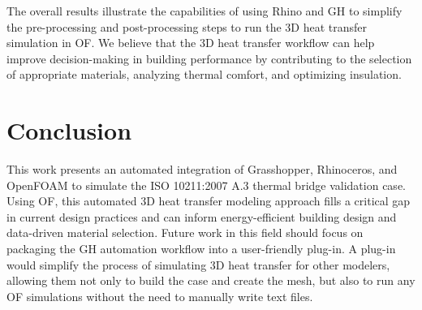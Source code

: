 \documentclass[runningheads]{llncs}
\begin{document}
The overall results illustrate the capabilities of using Rhino and GH to simplify the pre-processing and post-processing steps to run the 3D heat transfer simulation in OF. 
We believe that the 3D heat transfer workflow can help improve decision-making in building performance by contributing to the selection of appropriate materials, analyzing thermal comfort, and optimizing insulation. %


\enlargethispage{2\baselineskip}


\section{Conclusion}
This work presents an automated integration of Grasshopper, Rhinoceros, and OpenFOAM to simulate the ISO 10211:2007 A.3 thermal bridge validation case. Using OF, this automated 3D heat transfer modeling approach fills a critical gap in current design practices and can inform energy-efficient building design and data-driven material selection. Future work in this field should focus on packaging the GH automation workflow into a user-friendly plug-in. A plug-in would simplify the process of simulating 3D heat transfer for other modelers, allowing them not only to build the case and create the mesh, but also to run any OF simulations without the need to manually write text files. 

\enlargethispage{2\baselineskip}


\vspace{0.15in}
\small
{}
\end{document}
